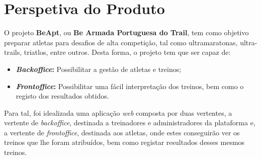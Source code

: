 \section{Perspetiva do Produto}

O projeto \textbf{BeApt}, ou \textbf{Be Armada Portuguesa do Trail}, tem como objetivo preparar atletas para desafios de alta competição, tal como ultramaratonas, ultra-trails, triatlos, entre outros. Desta forma, o projeto tem que ser capaz de:

\begin{itemize}
	\item \textbf{\textit{Backoffice}:} Possibilitar a gestão de atletas e treinos;
	\item \textbf{\textit{Frontoffice}:} Possibilitar uma fácil interpretação dos treinos, bem como o registo dos resultados obtidos.
\end{itemize}

Para tal, foi idealizada uma aplicação \textit{web} composta por duas vertentes, a vertente de \textit{backoffice}, destinada a treinadores e administradores da plataforma e, a vertente de \textit{frontoffice}, destinada aos atletas, onde estes conseguirão ver os treinos que lhe foram atribuídos, bem como registar resultados desses mesmos treinos.
